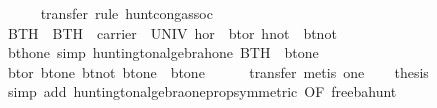 \begin{isabellebody}
\ \ \ \ \isamarkupfalse%
\ {}transfer{}\ rule\ hunt{}cong{}assoc{}\isanewline
{}\isamarkupfalse%
%
\endisatagproof
{\isafoldproof}%
%
\isadelimproof
\isanewline
%
\endisadelimproof
\isanewline
{}\isamarkupfalse%
\ BTH\ \ {}BTH\ {}\ {}carrier\ {}\ UNIV{}\ hor\ {}\ bt{}or{}\ hnot\ {}\ bt{}not{}{}\isanewline
\isanewline
{}\isamarkupfalse%
\ bt{}hone\ {}simp{}{}\ {}huntington{}algebra{}hone\ BTH\ {}\ bt{}one{}\isanewline
%
\isadelimproof
%
\endisadelimproof
%
\isatagproof
{}\isamarkupfalse%
\ {}\isanewline
\ \ \isamarkupfalse%
\ {}bt{}or\ bt{}one\ {}bt{}not\ bt{}one{}\ {}\ bt{}one{}\isanewline
\ \ \ \ \isamarkupfalse%
\ {}transfer{}\ metis\ one{}\isanewline
\ \ \isamarkupfalse%
\ {}thesis\isanewline
\ \ \ \ \isamarkupfalse%
\ {}simp\ add{}\ huntington{}algebra{}one{}prop{}symmetric{}\ OF\ free{}ba{}hunt{}{}\isanewline

\end{isabellebody}
